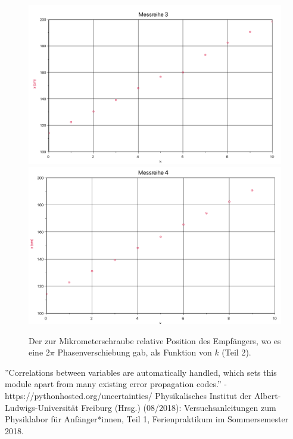 \documentclass[11pt,a4paper]{article}
\begin{document}
\begin{figure}
	\includegraphics[width=\linewidth]{Anhang3}
	\includegraphics[width=\linewidth]{Anhang4}
	\caption{Der zur Mikrometerschraube relative Position des Empfängers, wo es eine $2\pi$ Phasenverschiebung gab, als Funktion von $k$ (Teil 2).}
\end{figure}

\begin{thebibliography}{9}
''Correlations between variables are automatically handled, which sets this module apart from many existing error propagation codes.'' - https://pythonhosted.org/uncertainties/
 Physikalisches Institut der Albert-Ludwigs-Universität Freiburg (Hrsg.) (08/2018): Versuchsanleitungen zum Physiklabor für Anfänger*innen, Teil 1, Ferienpraktikum im Sommersemester 2018.
\end{thebibliography}
\end{document}
